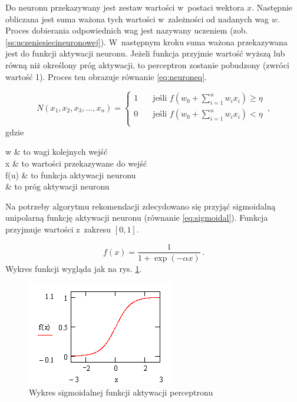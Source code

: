\documentclass[twoside]{iisthesis}
\begin{document}
	 Do neuronu przekazywany jest zestaw wartości w~postaci wektora $x$. Następnie obliczana jest suma ważona tych wartości w~zależności od nadanych wag $w$. Proces dobierania odpowiednich wag jest nazywany uczeniem (zob. \ref{ss:uczeniesiecineuronowej}). W~następnym kroku suma ważona przekazywana jest do funkcji aktywacji neuronu. Jeżeli funkcja przyjmie wartość wyższą lub równą niż określony próg aktywacji, to perceptron zostanie pobudzony (zwróci wartość 1). Proces ten obrazuje równanie \ref{eq:neuroneq}.
	 
	 \begin{equation}
	 \label{eq:neuroneq}
	 N(x_1, x_2, x_3, \ldots, x_n) = 
	 \begin{cases}
	 1       & \quad \text{jeśli } f(w_0 + \sum_{i=1}^{n}w_ix_i) \geq \eta\\
	 0		 & \quad \text{jeśli } f(w_0 + \sum_{i=1}^{n}w_ix_i) < \eta\\
	 \end{cases}
	 \,,
	 \end{equation}		 
	 gdzie
	 
	 \begin{conditions*}
	 	w & to wagi kolejnych wejść \\
	 	x & to wartości przekazywane do wejść \\
	 	f(u) & to funkcja aktywacji neuronu \\
	 	\eta & to próg aktywacji neuronu
	 \end{conditions*} 
	 
	 Na potrzeby algorytmu rekomendacji zdecydowano się przyjąć sigmoidalną unipolarną funkcję aktywacji neuronu (równanie \ref{eq:sigmoidal}). Funkcja przyjmuje wartości z~zakresu $[0,1]$.
	 
	 \begin{equation}
	 \label{eq:sigmoidal}
	 f(x) = \frac{1}{1 + \exp(-\alpha x)}
	 \,.
	 \end{equation}
	 Wykres funkcji wygląda jak na rys. \ref{fig:sigmoid}.
	 
	 \begin{figure}[!ht] 
	 	\centering
	 	\includegraphics{sigmoid}
	 	\caption{Wykres sigmoidalnej funkcji aktywacji perceptronu \protect\cite{aforgenet}}
	 	\label{fig:sigmoid}
	 \end{figure}
	 
\end{document}
